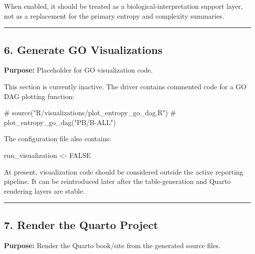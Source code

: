 \documentclass[
  letterpaper,
  DIV=11,
  numbers=noendperiod,
  openany,
  oneside]{scrreprt}
\newenvironment{Shaded}{\begin{snugshade}}{\end{snugshade}}
\newcommand{\CommentTok}[1]{\textcolor[rgb]{0.37,0.37,0.37}{#1}}
\newcommand{\ConstantTok}[1]{\textcolor[rgb]{0.56,0.35,0.01}{#1}}
\newcommand{\NormalTok}[1]{\textcolor[rgb]{0.00,0.23,0.31}{#1}}
\newcommand{\OtherTok}[1]{\textcolor[rgb]{0.00,0.23,0.31}{#1}}
\begin{document}
When enabled, it should be treated as a biological-interpretation
support layer, not as a replacement for the primary entropy and
complexity summaries.

\begin{center}\rule{0.5\linewidth}{0.5pt}\end{center}

\subsection*{6. Generate GO
Visualizations}\label{generate-go-visualizations}

\textbf{Purpose:} Placeholder for GO visualization code.

This section is currently inactive. The driver contains commented code
for a GO DAG plotting function:

\begin{Shaded}
\begin{Highlighting}[]
\CommentTok{\# source("R/visualizations/plot\_entropy\_go\_dag.R")}
\CommentTok{\# plot\_entropy\_go\_dag("PB/B{-}ALL")}
\end{Highlighting}
\end{Shaded}

The configuration file also contains:

\begin{Shaded}
\begin{Highlighting}[]
\NormalTok{run\_visualization }\OtherTok{\textless{}{-}} \ConstantTok{FALSE}
\end{Highlighting}
\end{Shaded}

At present, visualization code should be considered outside the active
reporting pipeline. It can be reintroduced later after the
table-generation and Quarto rendering layers are stable.

\begin{center}\rule{0.5\linewidth}{0.5pt}\end{center}

\subsection*{7. Render the Quarto
Project}\label{render-the-quarto-project}

\textbf{Purpose:} Render the Quarto book/site from the generated source
files.
\end{document}
